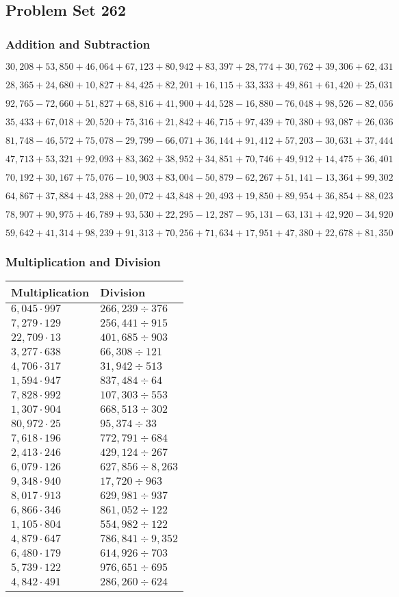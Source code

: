 \hypertarget{problem-set-262}{%
\subsection{Problem Set 262}\label{problem-set-262}}

\hypertarget{addition-and-subtraction}{%
\subsubsection{Addition and
Subtraction}\label{addition-and-subtraction}}

\(30,208+53,850+46,064+67,123+80,942+83,397+28,774+30,762+39,306+62,431\)

\(28,365+24,680+10,827+84,425+82,201+16,115+33,333+49,861+61,420+25,031\)

\(92,765-72,660+51,827+68,816+41,900+44,528-16,880-76,048+98,526-82,056\)

\(35,433+67,018+20,520+75,316+21,842+46,715+97,439+70,380+93,087+26,036\)

\(81,748-46,572+75,078-29,799-66,071+36,144+91,412+57,203-30,631+37,444\)

\(47,713+53,321+92,093+83,362+38,952+34,851+70,746+49,912+14,475+36,401\)

\(70,192+30,167+75,076-10,903+83,004-50,879-62,267+51,141-13,364+99,302\)

\(64,867+37,884+43,288+20,072+43,848+20,493+19,850+89,954+36,854+88,023\)

\(78,907+90,975+46,789+93,530+22,295-12,287-95,131-63,131+42,920-34,920\)

\(59,642+41,314+98,239+91,313+70,256+71,634+17,951+47,380+22,678+81,350\)

\hypertarget{multiplication-and-division}{%
\subsubsection{Multiplication and
Division}\label{multiplication-and-division}}

\begin{longtable}[]{@{}ll@{}}
\toprule
Multiplication & Division\tabularnewline
\midrule
\endhead
\(6,045\cdot997\) & \(266,239÷376\)\tabularnewline
\(7,279\cdot129\) & \(256,441÷915\)\tabularnewline
\(22,709\cdot13\) & \(401,685÷903\)\tabularnewline
\(3,277\cdot638\) & \(66,308÷121\)\tabularnewline
\(4,706\cdot317\) & \(31,942÷513\)\tabularnewline
\(1,594\cdot947\) & \(837,484÷64\)\tabularnewline
\(7,828\cdot992\) & \(107,303÷553\)\tabularnewline
\(1,307\cdot904\) & \(668,513÷302\)\tabularnewline
\(80,972\cdot25\) & \(95,374÷33\)\tabularnewline
\(7,618\cdot196\) & \(772,791÷684\)\tabularnewline
\(2,413\cdot246\) & \(429,124÷267\)\tabularnewline
\(6,079\cdot126\) & \(627,856÷8,263\)\tabularnewline
\(9,348\cdot940\) & \(17,720÷963\)\tabularnewline
\(8,017\cdot913\) & \(629,981÷937\)\tabularnewline
\(6,866\cdot346\) & \(861,052÷122\)\tabularnewline
\(1,105\cdot804\) & \(554,982÷122\)\tabularnewline
\(4,879\cdot647\) & \(786,841÷9,352\)\tabularnewline
\(6,480\cdot179\) & \(614,926÷703\)\tabularnewline
\(5,739\cdot122\) & \(976,651÷695\)\tabularnewline
\(4,842\cdot491\) & \(286,260÷624\)\tabularnewline
\bottomrule
\end{longtable}
